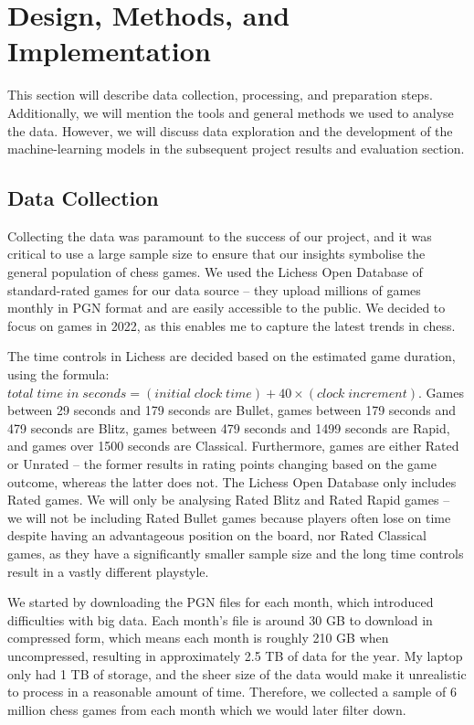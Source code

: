 \documentclass[a4paper, 11pt]{article}
\begin{document}
\section{Design, Methods, and Implementation}
This section will describe data collection, processing, and preparation steps. Additionally, we will mention the tools and general methods we used to analyse the data. However, we will discuss data exploration and the development of the machine-learning models in the subsequent project results and evaluation section.

\subsection{Data Collection}
Collecting the data was paramount to the success of our project, and it was critical to use a large sample size to ensure that our insights symbolise the general population of chess games. We used the Lichess Open Database \cite{lichessOpenDatabase} of standard-rated games for our data source -- they upload millions of games monthly in PGN format and are easily accessible to the public. We decided to focus on games in 2022, as this enables me to capture the latest trends in chess.

The time controls in Lichess are decided based on the estimated game duration, using the formula: $total \; time \; in \; seconds = (initial \; clock \; time) + 40 \times (clock \; increment)$. Games between 29 seconds and 179 seconds are Bullet, games between 179 seconds and 479 seconds are Blitz, games between 479 seconds and 1499 seconds are Rapid, and games over 1500 seconds are Classical. Furthermore, games are either Rated or Unrated -- the former results in rating points changing based on the game outcome, whereas the latter does not. The Lichess Open Database only includes Rated games. We will only be analysing Rated Blitz and Rated Rapid games -- we will not be including Rated Bullet games because players often lose on time despite having an advantageous position on the board, nor Rated Classical games, as they have a significantly smaller sample size and the long time controls result in a vastly different playstyle.

We started by downloading the PGN files for each month, which introduced difficulties with big data. Each month's file is around 30 GB to download in compressed form, which means each month is roughly 210 GB when uncompressed, resulting in approximately 2.5 TB of data for the year. My laptop only had 1 TB of storage, and the sheer size of the data would make it unrealistic to process in a reasonable amount of time. Therefore, we collected a sample of 6 million chess games from each month which we would later filter down.
\end{document}
